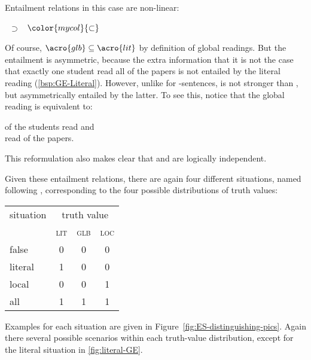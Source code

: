 \documentclass[fleqn,reqno,10pt,draft]{article}
\newcommand{\lit}{\acro{lit}}
\newcommand{\glb}{\acro{glb}}
\newcommand{\loc}{\acro{loc}}
\newcommand{\as}{\acro{as}}
\newcommand{\mymark}[1]{{\color{mycol}{#1}}}
\begin{document}
\noindent Entailment relations in this case are non-linear:
\begin{exe}
  \ex        \lit\ $\supset$ \glb\ $\color{mycol}{\subset}$ \loc 
\end{exe}
Of course, $\glb \subseteq \lit$ by definition of global readings. But
the entailment is asymmetric, because the extra information that it is
not the case that exactly one student read all of the papers is not
entailed by the literal reading (\ref{bsp:GE-Literal}). However,
unlike for \as-sentences, \loc is not stronger than \glb, but
asymmetrically entailed by the latter. To see this, notice that the
global reading is equivalent to:

\begin{exe}
   \label{test} \mymark{Exactly one} of the students read \mymark{some but not
    all} and \\
  \mymark{everybody else} read \mymark{none} of the papers.
\end{exe}

\noindent This reformulation also makes clear that \loc and \lit are
logically independent.

Given these entailment relations, there are again four different
situations, named following \citet{ChemlaSpector2010:Experimental-Ev},
corresponding to the four possible distributions of truth values:

\begin{center}
  \begin{tabular}{lccc}
    \toprule
    situation    & \multicolumn{3}{c}{truth value} 
  \\ 
  \cmidrule(r){2-4}
    & \textsc{lit} & \textsc{glb} & \textsc{loc} \\ \midrule
    false   & 0 & 0 & 0 \\
    literal & 1 & 0 & 0 \\
    local   & 0 & 0 & 1 \\
    all     & 1 & 1 & 1 \\ \bottomrule
  \end{tabular}
\end{center}

\noindent Examples for each situation are given in
Figure~\ref{fig:ES-distinguishing-pics}. Again there several possible
scenarios within each truth-value distribution, except for the literal
situation in \ref{fig:literal-GE}.
\end{document}
